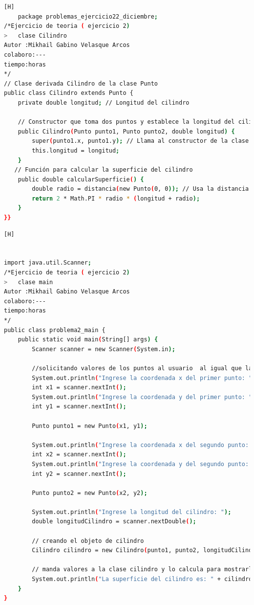 \documentclass{article}
\begin{document}
	\begin{lstlisting}[language=bash,caption={Creando la clase cilindro}][H]
	package problemas_ejercicio22_diciembre;
/*Ejercicio de teoria ( ejercicio 2)
>	clase Cilindro 
Autor :Mikhail Gabino Velasque Arcos
colaboro:---
tiempo:horas
*/
// Clase derivada Cilindro de la clase Punto
public class Cilindro extends Punto {
    private double longitud; // Longitud del cilindro

    // Constructor que toma dos puntos y establece la longitud del cilindro
    public Cilindro(Punto punto1, Punto punto2, double longitud) {
        super(punto1.x, punto1.y); // Llama al constructor de la clase base (Punto) para establecer las coordenadas del punto
        this.longitud = longitud;
    }
   // Función para calcular la superficie del cilindro
    public double calcularSuperficie() {
        double radio = distancia(new Punto(0, 0)); // Usa la distancia entre el punto y el origen como el radio
        return 2 * Math.PI * radio * (longitud + radio);
    }
}}
	\end{lstlisting}
	\begin{lstlisting}[language=bash,caption={Creando la clase Main}][H]


import java.util.Scanner;
/*Ejercicio de teoria ( ejercicio 2)
>	clase main  
Autor :Mikhail Gabino Velasque Arcos
colaboro:---
tiempo:horas
*/
public class problema2_main {
    public static void main(String[] args) {
        Scanner scanner = new Scanner(System.in);

        //solicitando valores de los puntos al usuario  al igual que la longitud 
        System.out.println("Ingrese la coordenada x del primer punto: ");
        int x1 = scanner.nextInt();
        System.out.println("Ingrese la coordenada y del primer punto: ");
        int y1 = scanner.nextInt();

        Punto punto1 = new Punto(x1, y1);

        System.out.println("Ingrese la coordenada x del segundo punto: ");
        int x2 = scanner.nextInt();
        System.out.println("Ingrese la coordenada y del segundo punto: ");
        int y2 = scanner.nextInt();

        Punto punto2 = new Punto(x2, y2);

        System.out.println("Ingrese la longitud del cilindro: ");
        double longitudCilindro = scanner.nextDouble();

        // creando el objeto de cilindro
        Cilindro cilindro = new Cilindro(punto1, punto2, longitudCilindro);

        // manda valores a la clase cilindro y lo calcula para mostrarlo
        System.out.println("La superficie del cilindro es: " + cilindro.calcularSuperficie());
    }
}


	\end{lstlisting}	
	
\end{document}
